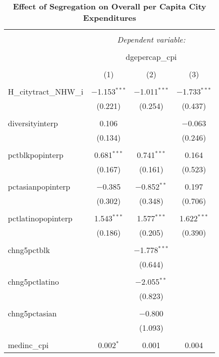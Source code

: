 \documentclass[]{article}
\begin{document}
\begin{table}[!htbp] \centering 
  \caption{\textbf{Effect of Segregation on Overall per Capita City Expenditures}} 
  \label{} 
\begin{tabular}{@{\extracolsep{5pt}}lccc} 
\\[-1.8ex]\hline 
\hline \\[-1.8ex] 
 & \multicolumn{3}{c}{\textit{Dependent variable:}} \\ 
\cline{2-4} 
\\[-1.8ex] & \multicolumn{3}{c}{dgepercap\_cpi} \\ 
\\[-1.8ex] & (1) & (2) & (3)\\ 
\hline \\[-1.8ex] 
 H\_citytract\_NHW\_i & $-$1.153$^{***}$ & $-$1.011$^{***}$ & $-$1.733$^{***}$ \\ 
  & (0.221) & (0.254) & (0.437) \\ 
  & & & \\ 
 diversityinterp & 0.106 &  & $-$0.063 \\ 
  & (0.134) &  & (0.246) \\ 
  & & & \\ 
 pctblkpopinterp & 0.681$^{***}$ & 0.741$^{***}$ & 0.164 \\ 
  & (0.167) & (0.161) & (0.523) \\ 
  & & & \\ 
 pctasianpopinterp & $-$0.385 & $-$0.852$^{**}$ & 0.197 \\ 
  & (0.302) & (0.348) & (0.706) \\ 
  & & & \\ 
 pctlatinopopinterp & 1.543$^{***}$ & 1.577$^{***}$ & 1.622$^{***}$ \\ 
  & (0.186) & (0.205) & (0.390) \\ 
  & & & \\ 
 chng5pctblk &  & $-$1.778$^{***}$ &  \\ 
  &  & (0.644) &  \\ 
  & & & \\ 
 chng5pctlatino &  & $-$2.055$^{**}$ &  \\ 
  &  & (0.823) &  \\ 
  & & & \\ 
 chng5pctasian &  & $-$0.800 &  \\ 
  &  & (1.093) &  \\ 
  & & & \\ 
 medinc\_cpi & 0.002$^{*}$ & 0.001 & 0.004 \\ 

\end{tabular}
\end{table}
\end{document}
